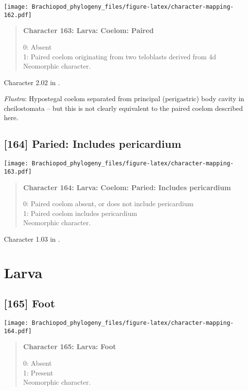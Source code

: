 \documentclass[openany]{book}
\theoremstyle{definition}
\theoremstyle{definition}
\theoremstyle{definition}
\theoremstyle{remark}
\begin{document}
\texttt{[image: Brachiopod\_phylogeny\_files/figure-latex/character-mapping-162.pdf]}

\begin{quote}
\textbf{Character 163: Larva: Coelom: Paired}

0: Absent\\
1: Paired coelom originating from two teloblasts derived from 4d\\
Neomorphic character.
\end{quote}

Character 2.02 in \citet{Scheltema1993}.

\hypertarget{Flustra-coding-163}{}
\emph{Flustra}: Hypostegal coelom separated from principal (perigastric)
body cavity in cheilostomata -- but this is not clearly equivalent to
the paired coelom described here.

\subsection*{{[}164{]} Paried: Includes
pericardium}\label{paried-includes-pericardium}

\texttt{[image: Brachiopod\_phylogeny\_files/figure-latex/character-mapping-163.pdf]}

\begin{quote}
\textbf{Character 164: Larva: Coelom: Paried: Includes pericardium}

0: Paired coelom absent, or does not include pericardium\\
1: Paired coelom includes pericardium\\
Neomorphic character.
\end{quote}

Character 1.03 in \citet{Scheltema1993}.

\section{Larva}\label{larva-1}

\subsection*{{[}165{]} Foot}\label{foot-1}

\texttt{[image: Brachiopod\_phylogeny\_files/figure-latex/character-mapping-164.pdf]}

\begin{quote}
\textbf{Character 165: Larva: Foot}

0: Absent\\
1: Present\\
Neomorphic character.
\end{quote}
\end{document}
